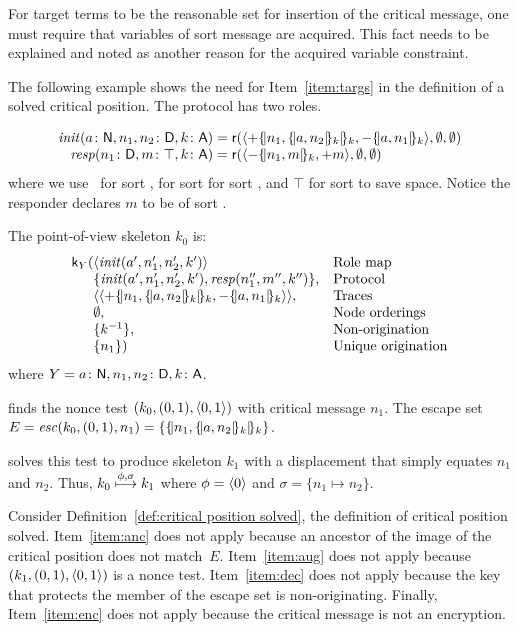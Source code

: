 \documentclass[12pt]{report}
\theoremstyle{definition}
\newenvironment{note}{\itshape\par}{}
\newcommand{\role}{\mathsf{r}}
\newcommand{\skel}{\mathsf{k}}
\newcommand{\init}{\fn{init}}
\newcommand{\resp}{\fn{resp}}
\begin{document}
\begin{note}
For target terms to be the reasonable set for insertion of the
critical message, one must require that variables of sort message are
acquired.  This fact needs to be explained and noted as another reason
for the acquired variable constraint.
\end{note}

The following example shows the need for Item~\ref{item:targs} in the
definition of a solved critical position.  The protocol has two roles.

\[\begin{array}{r@{{}={}}l}
\init(a\colon\srt{N},n_1,n_2\colon\srt{D},k\colon\srt{A})&
\role(\seq{\outbnd\enc{n_1,\enc{a,n_2}{k}}{k},\inbnd\enc{a,n_1}{k}},
\emptyset,\emptyset)\\
\resp(n_1\colon\srt{D},m\colon\top,k\colon\srt{A})&
\role(\seq{\inbnd\enc{n_1,m}{k},\outbnd m},
\emptyset,\emptyset)
\end{array}\]
where we use~ for sort ,  for sort 
 for sort , and $\top$ for sort  to save
space.  Notice the responder declares $m$ to be of sort .

The point-of-view skeleton $k_0$ is:
\[\begin{array}{r@{}ll}
\skel_Y(
&\seq{\init(a',n'_1, n'_2,k')}
&\mbox{Role map}\\
&\{\init(a',n'_1, n'_2,k'),\resp(n''_1,m'',k'')\},
&\mbox{Protocol}\\
&\seq{\seq{\outbnd\enc{n_1,\enc{a,n_2}{k}}{k},\inbnd\enc{a,n_1}{k}}},
&\mbox{Traces}\\
&\emptyset,
&\mbox{Node orderings}\\
&\{k^{-1}\},
&\mbox{Non-origination}\\
&\{n_1\})
&\mbox{Unique origination}
\end{array}\]
where $Y=a\colon\mathsf{N},n_1,n_2\colon\mathsf{D},k\colon\mathsf{A}$.

{\cpsa} finds the nonce test $(k_0,(0,1),\langle0,1\rangle)$ with critical
message $n_1$.  The escape set $E=\operatorname{\mathit{esc}}(k_0, (0,1), n_1) =
\{\{\!|n_1,\{\!|a,n_2|\!\}_{k}|\!\}_{k}\}$.

{\cpsa} solves this test to produce skeleton $k_1$ with a displacement
that simply equates $n_1$ and $n_2$.  Thus,
$k_0\stackrel{\phi,\sigma}{\longmapsto}k_1$ where $\phi=\langle0\rangle$ and
$\sigma=\{n_1\mapsto n_2\}$.

Consider Definition~\ref{def:critical position solved}, the definition
of critical position solved.  Item~\ref{item:anc} does not apply
because an ancestor of the image of the critical position does not
match~$E$.  Item~\ref{item:aug} does not apply because
$(k_1,(0,1),\langle0,1\rangle)$ is a nonce test.  Item~\ref{item:dec} does not
apply because the key that protects the member of the escape set is
non-originating.  Finally, Item~\ref{item:enc} does not apply because
the critical message is not an encryption.
\end{document}

